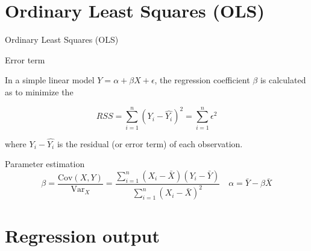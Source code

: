 \documentclass[t]{beamer}
\begin{document}
	
	\section{Ordinary Least Squares (OLS)}

	\begin{frame}[c]{Ordinary Least Squares (OLS)}
		
		\begin{block}{Error term}

		In a simple linear model $Y = \alpha + \beta X + \epsilon$, the regression coefficient $\beta$ is calculated as to minimize the 

		$$RSS = \sum _{i=1} ^n (Y_i - \hat{Y_i})^2 = \sum _{i=1} ^n \epsilon^2$$

		where $Y_i - \hat{Y_i}$ is the residual (or error term) of each observation.
		\end{block}
		
		\begin{block}{Parameter estimation}
			$$\beta = \frac{\text{Cov}(X,Y)}{\text{Var}_X} = \frac{\sum ^n _{i=1}(X_i - \bar{X}) (Y_i - \bar{Y})}{\sum ^n _{i=1}(X_i - \bar{X})^2} \quad \alpha = \bar{Y} - \beta\bar{X}$$
		\end{block}
				
	\end{frame}




	\section{Regression output}
				
\end{document}
